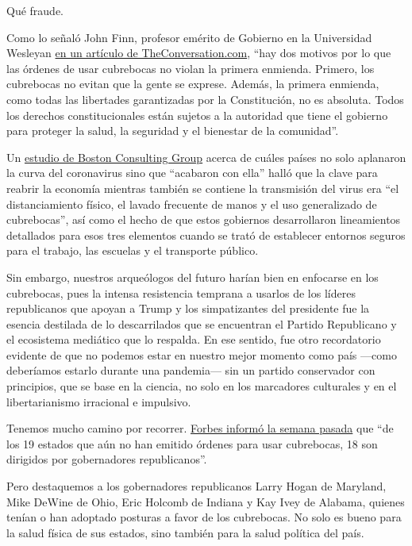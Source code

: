 Qué fraude.

Como lo señaló John Finn, profesor emérito de Gobierno en la Universidad
Wesleyan
\href{https://theconversation.com/the-constitution-doesnt-have-a-problem-with-mask-mandates-142335}{en
un artículo de TheConversation.com}, ``hay dos motivos por lo que las
órdenes de usar cubrebocas no violan la primera enmienda. Primero, los
cubrebocas no evitan que la gente se exprese. Además, la primera
enmienda, como todas las libertades garantizadas por la Constitución, no
es absoluta. Todos los derechos constitucionales están sujetos a la
autoridad que tiene el gobierno para proteger la salud, la seguridad y
el bienestar de la comunidad''.

Un
\href{https://www.bcg.com/publications/2020/why-its-not-too-late-to-contain-the-virus}{estudio
de Boston Consulting Group} acerca de cuáles países no solo aplanaron la
curva del coronavirus sino que ``acabaron con ella'' halló que la clave
para reabrir la economía mientras también se contiene la transmisión del
virus era ``el distanciamiento físico, el lavado frecuente de manos y el
uso generalizado de cubrebocas'', así como el hecho de que estos
gobiernos desarrollaron lineamientos detallados para esos tres elementos
cuando se trató de establecer entornos seguros para el trabajo, las
escuelas y el transporte público.

Sin embargo, nuestros arqueólogos del futuro harían bien en enfocarse en
los cubrebocas, pues la intensa resistencia temprana a usarlos de los
líderes republicanos que apoyan a Trump y los simpatizantes del
presidente fue la esencia destilada de lo descarrilados que se
encuentran el Partido Republicano y el ecosistema mediático que lo
respalda. En ese sentido, fue otro recordatorio evidente de que no
podemos estar en nuestro mejor momento como país ---como deberíamos
estarlo durante una pandemia--- sin un partido conservador con
principios, que se base en la ciencia, no solo en los marcadores
culturales y en el libertarianismo irracional e impulsivo.

Tenemos mucho camino por recorrer.
\href{https://www.forbes.com/sites/jackbrewster/2020/07/24/19-states-still-dont-mandate-masks-18-are-run-by-republican-governors/\#4b5e331d6243}{Forbes
informó la semana pasada} que ``de los 19 estados que aún no han emitido
órdenes para usar cubrebocas, 18 son dirigidos por gobernadores
republicanos''.

Pero destaquemos a los gobernadores republicanos Larry Hogan de
Maryland, Mike DeWine de Ohio, Eric Holcomb de Indiana y Kay Ivey de
Alabama, quienes tenían o han adoptado posturas a favor de los
cubrebocas. No solo es bueno para la salud física de sus estados, sino
también para la salud política del país.

